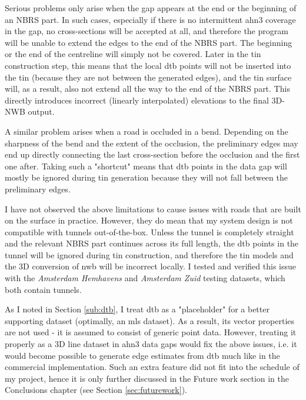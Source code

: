 Serious problems only arise when the gap appears at the end or the beginning of an NBRS part. In such cases, especially if there is no intermittent \ac{ahn3} coverage in the gap, no cross-sections will be accepted at all, and therefore the program will be unable to extend the edges to the end of the NBRS part. The beginning or the end of the centreline will simply not be covered. Later in the \ac{tin} construction step, this means that the local \ac{dtb} points will not be inserted into the \ac{tin} (because they are not between the generated edges), and the \ac{tin} surface will, as a result, also not extend all the way to the end of the NBRS part. This directly introduces incorrect (linearly interpolated) elevations to the final 3D-NWB output.

A similar problem arises when a road is occluded in a bend. Depending on the sharpness of the bend and the extent of the occlusion, the preliminary edges may end up directly connecting the last cross-section before the occlusion and the first one after. Taking such a "shortcut" means that \ac{dtb} points in the data gap will mostly be ignored during \ac{tin} generation because they will not fall between the preliminary edges.

I have not observed the above limitations to cause issues with roads that are built on the surface in practice. However, they do mean that my system design is not compatible with tunnels out-of-the-box. Unless the tunnel is completely straight and the relevant NBRS part continues across its full length, the \ac{dtb} points in the tunnel will be ignored during \ac{tin} construction, and therefore the \ac{tin} models and the 3D conversion of \ac{nwb} will be incorrect locally. I tested and verified this issue with the \textit{Amsterdam Hemhavens} and \textit{Amsterdam Zuid} testing datasets, which both contain tunnels.

As I noted in Section \ref{sub:dtb}, I treat \ac{dtb} as a "placeholder" for a better supporting dataset (optimally, an \ac{mls} dataset). As a result, its vector properties are not used - it is assumed to consist of generic point data. However, treating it properly as a 3D line dataset in \ac{ahn3} data gaps would fix the above issues, i.e. it would become possible to generate edge estimates from \ac{dtb} much like in the commercial implementation. Such an extra feature did not fit into the schedule of my project, hence it is only further discussed in the Future work section in the Conclusions chapter (see Section \ref{sec:futurework}).

